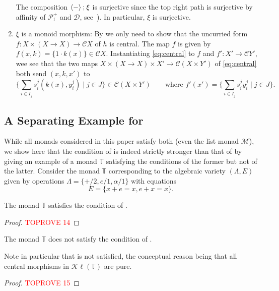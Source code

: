\documentclass[a4paper, UKenglish, numberwithinsect, thm-restate, cleveref, final]{lipics-v2021}
\theoremstyle{plain}
\theoremstyle{definition}
\newcommand{\C}{\ensuremath{\mathcal{C}}}
\newcommand{\T}{\ensuremath{\mathbb{T}}\xspace}
\newcommand{\seq}{\ensuremath{\mathbin{\text{\upshape;}}}}
\newcommand{\Kl}{\ensuremath{\mathcal{K}\!\ell}}
\newcommand{\Pfp}{\ensuremath{\mathcal{P}_{\mathrm{f}}^{+}}}
\numberwithin{equation}{section}
\begin{document}
\begin{enumerate}[(1)]
    The composition \( \langle - \rangle \seq \xi  \) is surjective since the top right path is surjective by affinity of \(\Pfp\) and \(\mathcal{D}\), see~). In particular, \(\xi\) is surjective.
\item $\xi$ is a monoid morphism:  By  we only need to show that the uncurried form $f\colon X\times (X\to X)\to \C X$ of $h$ is central. The map $f$ is given by $f(x,k)=\{1\cdot k(x)\}\in \C X$.  Instantiating \eqref{eq:central} to $f$ and $f'\colon X'\to \C Y'$, wee see that the two maps $X\times (X\to  X)\times X'\to \C(X\times Y')$ of \eqref{eq:central} both send $(x,k,x')$ to \[\{ \sum_{i\in I_j} s_i^j (k(x),y_i^j) \mid j\in J \} \in \C(X\times Y') \qquad \text{where } f'(x')= \{ \sum_{i\in I_j} s_i^j y_i^j \mid j\in J \}.\]
\end{enumerate}

\subsection*{A Separating Example for }
\label{app:sep-ex}

While all monads considered in this paper satisfy both  (even the list monad \(\mathcal{M}\)),
we show here that the condition of  is indeed strictly stronger than that of  by giving an example of a monad \T{} satisfying the conditions of the former but not of the latter.
Consider the monad \T{} corresponding to the algebraic variety $(\Lambda, E)$ given by operations \(\Lambda = \{+/2, e/1, \alpha/1\}\) with equations
\begin{equation}
  \label{eq:E}
  E = \{x + e = x, e + x = x\}.
\end{equation}

\begin{lemma}
  The monad \T{} satisfies the condition of .
\end{lemma}
\begin{proof}\textcolor{red}{TOPROVE 14}\end{proof}

\begin{lemma}
  The monad \T{} does not satisfy the condition of .
\end{lemma}
Note in particular that  is not satisfied, the conceptual reason being that all central morphisms in $\Kl(\T)$ are pure.
\begin{proof}\textcolor{red}{TOPROVE 15}\end{proof}
\end{document}
